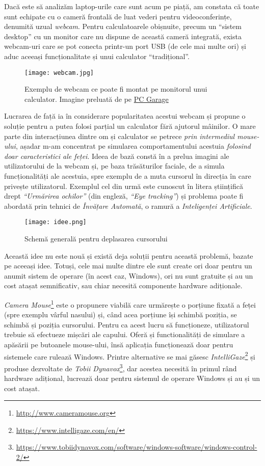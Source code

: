 Dacă este să analizăm laptop-urile care sunt acum pe piață, am constata că toate sunt echipate cu o cameră frontală de luat vederi pentru videoconferințe, denumită uzual \emph{webcam}.
Pentru calculatoarele obișnuite, precum un ``sistem desktop'' cu un monitor care nu dispune de această cameră integrată, exista webcam-uri care se pot conecta printr-un port USB (de cele mai multe ori) și aduc aceeași funcționalitate și unui calculator ``tradițional''.

\begin{figure}[h]
    \centering
    \texttt{[image: webcam.jpg]}
    \caption{Exemplu de webcam ce poate fi montat pe monitorul unui calculator. Imagine preluată de pe \href{https://www.pcgarage.ro/camere-web/logitech/streamcam-off-white/}{PC Garage}}
\end{figure}

Lucrarea de față ia în considerare popularitatea acestui webcam și propune o soluție pentru a putea folosi parțial un calculator fără ajutorul mâinilor.
O mare parte din interacțiunea dintre om și calculator se petrece \emph{prin intermediul mouse-ului}, așadar m-am concentrat pe simularea comportamentului acestuia \emph{folosind doar caracteristici ale feței}.
Ideea de bază constă în a prelua imagini ale utilizatorului de la webcam și, pe baza trăsăturilor faciale, de a simula funcționalități ale acestuia, spre exemplu de a muta cursorul în direcția în care privește utilizatorul.
Exemplul cel din urmă este cunoscut în litera științifică drept \emph{``Urmărirea ochilor''} (din engleză, \emph{``Eye tracking''}) și problema poate fi abordată prin tehnici de \emph{Învățare Automată}, o ramură a \emph{Inteligenței Artificiale}.

\begin{figure}[h]
    \centering
    \texttt{[image: idee.png]}
    \caption{Schemă generală pentru deplasarea cursorului}
\end{figure}

Această idee nu este nouă și există deja soluții pentru această problemă, bazate pe aceeași idee.
Totuși, cele mai multe dintre ele sunt create ori doar pentru un anumit sistem de operare (în acest caz, Windows), ori nu sunt gratuite și au un cost atașat semnificativ, sau chiar necesită componente hardware adiționale.

\emph{Camera Mouse}\footnote{\url{http://www.cameramouse.org}} este o propunere viabilă care urmărește o porțiune fixată a feței (spre exemplu vârful nasului) și, când acea porțiune își schimbă poziția, se schimbă și poziția cursorului.
Pentru ca acest lucru să funcționeze, utilizatorul trebuie să efectueze mișcări ale capului.
Oferă și functionalități de simulare a apăsării pe butoanele mouse-ului, însă aplicația funcționează doar pentru sistemele care rulează Windows.
Printre alternative se mai găsesc \emph{IntelliGaze}\footnote{\url{https://www.intelligaze.com/en/}} și produse dezvoltate de \emph{Tobii Dynavox}\footnote{\url{https://www.tobiidynavox.com/software/windows-software/windows-control-2/}}, dar acestea necesită în primul rând hardware adițional, lucrează doar pentru sistemul de operare Windows și au și un cost atașat.

